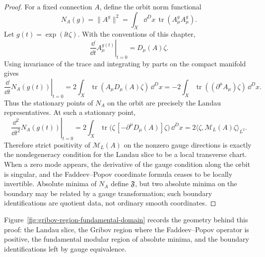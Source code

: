 \begin{proof}
For a fixed connection \(A\), define the orbit norm functional
\[
  N_A(g)=\|A^g\|^2
  =
  \int_X\dd^D x\,\operatorname{tr}(A_\mu^g A_\mu^g).
\]
Let \(g(t)=\exp(\ii t\zeta)\).  With the conventions of this chapter,
\[
  \left.\frac{\dd}{\dd t}A_\mu^{g(t)}\right|_{t=0}
  =
  D_\mu(A)\zeta .
\]
Using invariance of the trace and integrating by parts on the compact
manifold gives
\[
  \left.\frac{\dd}{\dd t}N_A(g(t))\right|_{t=0}
  =
  2\int_X\operatorname{tr}(A_\mu D_\mu(A)\zeta)\,\dd^D x
  =
  -2\int_X\operatorname{tr}((\partial^\mu A_\mu)\zeta)\,\dd^D x .
\]
Thus the stationary points of \(N_A\) on the orbit are precisely the Landau
representatives.  At such a stationary point,
\[
  \left.
  \frac{\dd^2}{\dd t^2}N_A(g(t))
  \right|_{t=0}
  =
  2\int_X\operatorname{tr}\bigl(\zeta\,[-\partial^\mu D_\mu(A)]\zeta\bigr)
  \,\dd^D x
  =
  2\langle\zeta,\mathcal M_L(A)\zeta\rangle_{L^2}.
\]
Therefore strict positivity of \(\mathcal M_L(A)\) on the nonzero gauge
directions is exactly the nondegeneracy condition for the Landau slice to be a
local transverse chart.  When a zero mode appears, the derivative of the gauge
condition along the orbit is singular, and the Faddeev--Popov coordinate
formula ceases to be locally invertible.  Absolute minima of \(N_A\) define
\(\mathfrak F\), but two absolute minima on the boundary may be related by a
gauge transformation; such boundary identifications are quotient data, not
ordinary smooth coordinates.
\end{proof}

Figure~\ref{fig:gribov-region-fundamental-domain} records the geometry behind
this proof: the Landau slice, the Gribov region where the Faddeev--Popov
operator is positive, the fundamental modular region of absolute minima, and
the boundary identifications left by gauge equivalence.

